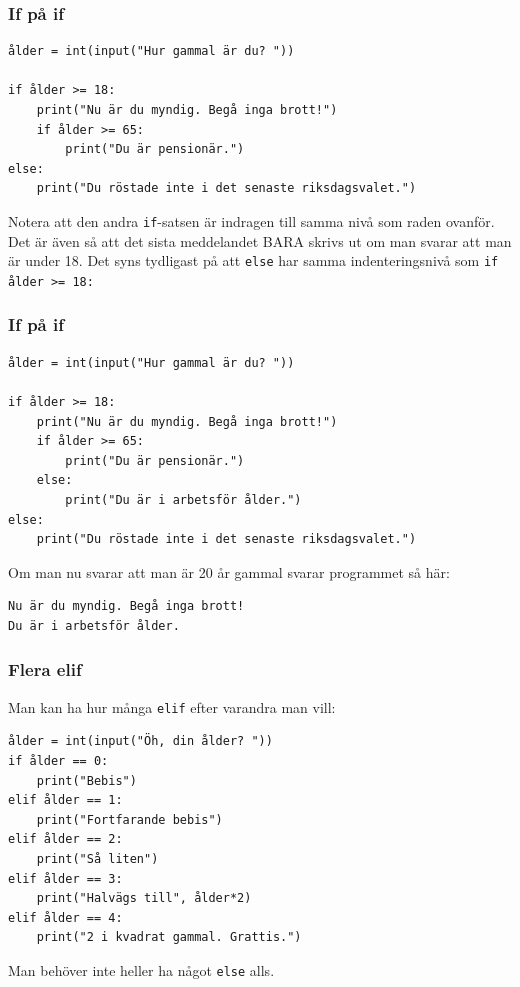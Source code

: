 \documentclass[aspectratio=169]{beamer}
\begin{document}
\begin{frame}[fragile]
	\frametitle{If på if}
	
	\begin{lstlisting}
ålder = int(input("Hur gammal är du? "))

if ålder >= 18:
    print("Nu är du myndig. Begå inga brott!")
    if ålder >= 65:
        print("Du är pensionär.")
else:
    print("Du röstade inte i det senaste riksdagsvalet.")
	\end{lstlisting}
	
	Notera att den andra \lstinline{if}-satsen är indragen till samma nivå som raden ovanför. Det är även så att det sista meddelandet BARA skrivs ut om man svarar att man är under 18. Det syns tydligast på att \lstinline{else} har samma indenteringsnivå som \lstinline{if ålder >= 18:}

\end{frame}

\begin{frame}[fragile]
	\frametitle{If på if}
	
	\begin{lstlisting}
ålder = int(input("Hur gammal är du? "))

if ålder >= 18:
    print("Nu är du myndig. Begå inga brott!")
    if ålder >= 65:
        print("Du är pensionär.")
    else:
        print("Du är i arbetsför ålder.")
else:
    print("Du röstade inte i det senaste riksdagsvalet.")
	\end{lstlisting}
	
	Om man nu svarar att man är 20 år gammal svarar programmet så här:
	
	\begin{lstlisting}
Nu är du myndig. Begå inga brott!
Du är i arbetsför ålder.
	\end{lstlisting}

\end{frame}

\begin{frame}[fragile]
	\frametitle{Flera elif}

	Man kan ha hur många \lstinline{elif} efter varandra man vill:
	
	\begin{lstlisting}
ålder = int(input("Öh, din ålder? "))
if ålder == 0:
    print("Bebis")
elif ålder == 1:
    print("Fortfarande bebis")
elif ålder == 2:
    print("Så liten")
elif ålder == 3:
    print("Halvägs till", ålder*2)
elif ålder == 4:
    print("2 i kvadrat gammal. Grattis.")
	\end{lstlisting}
	
	Man behöver inte heller ha något \lstinline{else} alls.

\end{frame}
\end{document}
